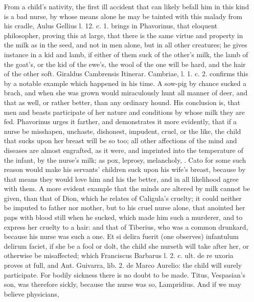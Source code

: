 {From a child's nativity, the first ill accident that can likely befall
him in this kind is a bad nurse, by whose means alone he may be tainted
with this malady from his cradle, Aulus Gellius l. 12. c. 1.
brings in Phavorinus, that eloquent philosopher, proving this at large,
 that there is the same virtue and property in the milk as in the
seed, and not in men alone, but in all other creatures; he gives
instance in a kid and lamb, if either of them suck of the other's milk,
the lamb of the goat's, or the kid of the ewe's, the wool of the one
will be hard, and the hair of the other soft. Giraldus Cambrensis
Itinerar. Cambriae, l. 1. c. 2. confirms this by a notable example
which happened in his time. A sow-pig by chance sucked a brach, and
when she was grown would miraculously hunt all manner of deer,
and that as well, or rather better, than any ordinary hound. His
conclusion is, that men and beasts participate of her nature and
conditions by whose milk they are fed. Phavorinus urges it farther, and
demonstrates it more evidently, that if a nurse be misshapen,
unchaste, dishonest, impudent, cruel, or the like, the child that
sucks upon her breast will be so too; all other affections of the mind
and diseases are almost engrafted, as it were, and imprinted into the
temperature of the infant, by the nurse's milk; as pox, leprosy,
melancholy, \etc{}. Cato for some such reason would make his servants'
children suck upon his wife's breast, because by that means they would
love him and his the better, and in all likelihood agree with them. A
more evident example that the minds are altered by milk cannot be
given, than that of Dion, which he relates of Caligula's cruelty;
it could neither be imputed to father nor mother, but to his cruel
nurse alone, that anointed her paps with blood still when he sucked,
which made him such a murderer, and to express her cruelty to a hair:
and that of Tiberius, who was a common drunkard, because his nurse was
such a one. Et si delira fuerit (one observes) infantulum delirum
faciet, if she be a fool or dolt, the child she nurseth will take after
her, or otherwise be misaffected; which Franciscus Barbarus l. 2. c.
ult. de re uxoria proves at full, and Ant. Guivarra, lib. 2. de Marco
Aurelio: the child will surely participate. For bodily sickness there
is no doubt to be made. Titus, Vespasian's son, was therefore sickly,
because the nurse was so, Lampridius. And if we may believe physicians,
}
